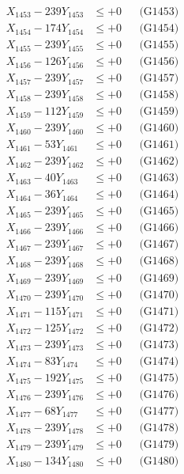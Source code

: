 \documentclass[a4paper,10pt]{article}
\begin{document}
{\begin{align}
X_{1453} - 239Y_{1453} &\leq +0 && \text{(G1453)} \\
X_{1454} - 174Y_{1454} &\leq +0 && \text{(G1454)} \\
X_{1455} - 239Y_{1455} &\leq +0 && \text{(G1455)} \\
X_{1456} - 126Y_{1456} &\leq +0 && \text{(G1456)} \\
X_{1457} - 239Y_{1457} &\leq +0 && \text{(G1457)} \\
X_{1458} - 239Y_{1458} &\leq +0 && \text{(G1458)} \\
X_{1459} - 112Y_{1459} &\leq +0 && \text{(G1459)} \\
X_{1460} - 239Y_{1460} &\leq +0 && \text{(G1460)} \\
\allowbreak
X_{1461} - 53Y_{1461} &\leq +0 && \text{(G1461)} \\
X_{1462} - 239Y_{1462} &\leq +0 && \text{(G1462)} \\
X_{1463} - 40Y_{1463} &\leq +0 && \text{(G1463)} \\
X_{1464} - 36Y_{1464} &\leq +0 && \text{(G1464)} \\
X_{1465} - 239Y_{1465} &\leq +0 && \text{(G1465)} \\
X_{1466} - 239Y_{1466} &\leq +0 && \text{(G1466)} \\
X_{1467} - 239Y_{1467} &\leq +0 && \text{(G1467)} \\
X_{1468} - 239Y_{1468} &\leq +0 && \text{(G1468)} \\
X_{1469} - 239Y_{1469} &\leq +0 && \text{(G1469)} \\
X_{1470} - 239Y_{1470} &\leq +0 && \text{(G1470)} \\
\allowbreak
X_{1471} - 115Y_{1471} &\leq +0 && \text{(G1471)} \\
X_{1472} - 125Y_{1472} &\leq +0 && \text{(G1472)} \\
X_{1473} - 239Y_{1473} &\leq +0 && \text{(G1473)} \\
X_{1474} - 83Y_{1474} &\leq +0 && \text{(G1474)} \\
X_{1475} - 192Y_{1475} &\leq +0 && \text{(G1475)} \\
X_{1476} - 239Y_{1476} &\leq +0 && \text{(G1476)} \\
X_{1477} - 68Y_{1477} &\leq +0 && \text{(G1477)} \\
X_{1478} - 239Y_{1478} &\leq +0 && \text{(G1478)} \\
X_{1479} - 239Y_{1479} &\leq +0 && \text{(G1479)} \\
X_{1480} - 134Y_{1480} &\leq +0 && \text{(G1480)} \\

\end{align}}
\end{document}
